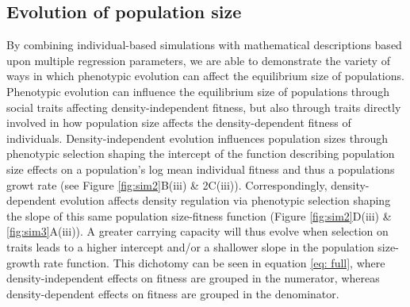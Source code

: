 \documentclass{article}
\begin{document}
\subsection{Evolution of population size}
By combining individual-based simulations with mathematical descriptions based upon multiple regression parameters, we are able to demonstrate the variety of ways in which phenotypic evolution can affect the equilibrium size of populations. Phenotypic evolution can influence the equilibrium size of populations through social traits affecting density-independent fitness, but also through traits directly involved in how population size affects the density-dependent fitness of individuals. Density-independent evolution influences population sizes through phenotypic selection shaping the intercept of the function describing population size effects on a population's log mean individual fitness and thus a populations growt rate (see Figure \ref{fig:sim2}B(iii) \& 2C(iii)). Correspondingly, density-dependent evolution affects density regulation via phenotypic selection shaping the slope of this same population size-fitness function (Figure \ref{fig:sim2}D(iii) \& \ref{fig:sim3}A(iii)). A greater carrying capacity will thus evolve when selection on traits leads to a higher intercept and/or a shallower slope in the population size-growth rate function. This dichotomy can be seen in equation \ref{eq: full}, where density-independent effects on fitness are grouped in the numerator, whereas density-dependent effects on fitness are grouped in the denominator.
\end{document}
